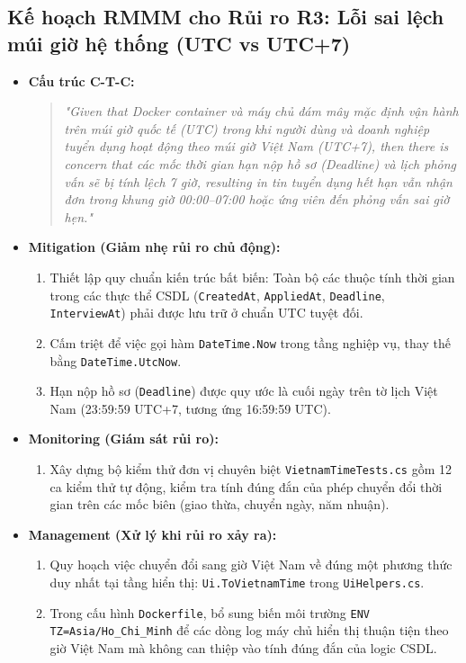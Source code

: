 \subsection{Kế hoạch RMMM cho Rủi ro R3: Lỗi sai lệch múi giờ hệ thống (UTC vs UTC+7)}
\begin{itemize}
    \item \textbf{Cấu trúc C-T-C:} 
    \begin{quote}
    \textit{"Given that Docker container và máy chủ đám mây mặc định vận hành trên múi giờ quốc tế (UTC) trong khi người dùng và doanh nghiệp tuyển dụng hoạt động theo múi giờ Việt Nam (UTC+7), then there is concern that các mốc thời gian hạn nộp hồ sơ (Deadline) và lịch phỏng vấn sẽ bị tính lệch 7 giờ, resulting in tin tuyển dụng hết hạn vẫn nhận đơn trong khung giờ 00:00--07:00 hoặc ứng viên đến phỏng vấn sai giờ hẹn."}
    \end{quote}
    \item \textbf{Mitigation (Giảm nhẹ rủi ro chủ động):}
    \begin{enumerate}
        \item Thiết lập quy chuẩn kiến trúc bất biến: Toàn bộ các thuộc tính thời gian trong các thực thể CSDL (\texttt{CreatedAt}, \texttt{AppliedAt}, \texttt{Deadline}, \texttt{InterviewAt}) phải được lưu trữ ở chuẩn UTC tuyệt đối.
        \item Cấm triệt để việc gọi hàm \texttt{DateTime.Now} trong tầng nghiệp vụ, thay thế bằng \texttt{DateTime.UtcNow}.
        \item Hạn nộp hồ sơ (\texttt{Deadline}) được quy ước là cuối ngày trên tờ lịch Việt Nam (23:59:59 UTC+7, tương ứng 16:59:59 UTC).
    \end{enumerate}
    \item \textbf{Monitoring (Giám sát rủi ro):}
    \begin{enumerate}
        \item Xây dựng bộ kiểm thử đơn vị chuyên biệt \texttt{VietnamTimeTests.cs} gồm 12 ca kiểm thử tự động, kiểm tra tính đúng đắn của phép chuyển đổi thời gian trên các mốc biên (giao thừa, chuyển ngày, năm nhuận).
    \end{enumerate}
    \item \textbf{Management (Xử lý khi rủi ro xảy ra):}
    \begin{enumerate}
        \item Quy hoạch việc chuyển đổi sang giờ Việt Nam về đúng một phương thức duy nhất tại tầng hiển thị: \texttt{Ui.ToVietnamTime} trong \texttt{UiHelpers.cs}.
        \item Trong cấu hình \texttt{Dockerfile}, bổ sung biến môi trường \texttt{ENV TZ=Asia/Ho\_Chi\_Minh} để các dòng log máy chủ hiển thị thuận tiện theo giờ Việt Nam mà không can thiệp vào tính đúng đắn của logic CSDL.
    \end{enumerate}
\end{itemize}
